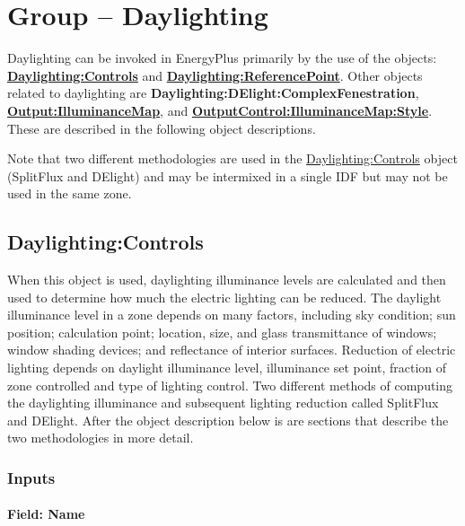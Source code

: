 \section{Group -- Daylighting}\label{group-daylighting}

Daylighting can be invoked in EnergyPlus primarily by the use of the objects: \textbf{\hyperref[daylightingcontrols-000]{Daylighting:Controls}} and \textbf{\hyperref[daylightingreferencepoint-000]{Daylighting:ReferencePoint}}. Other objects related to daylighting are \textbf{Daylighting:DElight:ComplexFenestration}, \textbf{\hyperref[outputilluminancemap]{Output:IlluminanceMap}}, and \textbf{\hyperref[outputcontrolilluminancemapstyle]{OutputControl:IlluminanceMap:Style}}.  These are described in the following object descriptions.

\begin{callout}
  Note that two different methodologies are used in the \hyperref[daylightingcontrols-000]{Daylighting:Controls} object (SplitFlux and DElight) and may be intermixed in a single IDF but may not be used in the same zone.
\end{callout}

\subsection{Daylighting:Controls}\label{daylightingcontrols-000}

When this object is used, daylighting illuminance levels are calculated and then used to determine how much the electric lighting can be reduced. The daylight illuminance level in a zone depends on many factors, including sky condition; sun position; calculation point; location, size, and glass transmittance of windows; window shading devices; and reflectance of interior surfaces. Reduction of electric lighting depends on daylight illuminance level, illuminance set point, fraction of zone controlled and type of lighting control. Two different methods of computing the daylighting illuminance and subsequent lighting reduction called SplitFlux and DElight. After the object description below is are sections that describe the two methodologies in more detail.

\subsubsection{Inputs}\label{inputs-009}

\paragraph{Field: Name}\label{field-name-001}

